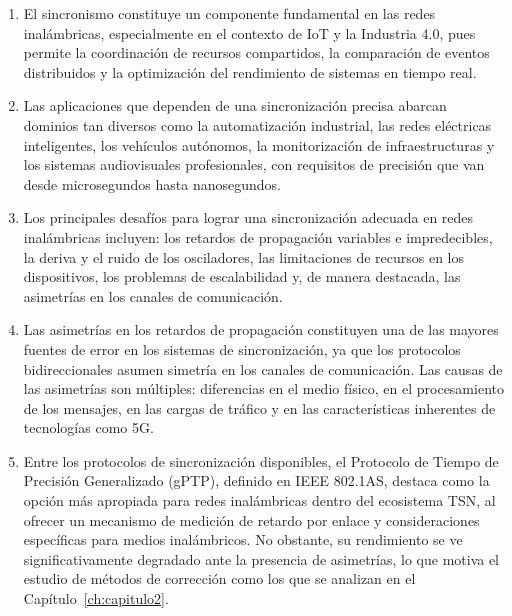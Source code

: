 \begin{enumerate}
\item El sincronismo constituye un componente fundamental en las redes inalámbricas, especialmente en el contexto de IoT y la Industria 4.0, pues permite la coordinación de recursos compartidos, la comparación de eventos distribuidos y la optimización del rendimiento de sistemas en tiempo real.

\item Las aplicaciones que dependen de una sincronización precisa abarcan dominios tan diversos como la automatización industrial, las redes eléctricas inteligentes, los vehículos autónomos, la monitorización de infraestructuras y los sistemas audiovisuales profesionales, con requisitos de precisión que van desde microsegundos hasta nanosegundos.

\item Los principales desafíos para lograr una sincronización adecuada en redes inalámbricas incluyen: los retardos de propagación variables e impredecibles, la deriva y el ruido de los osciladores, las limitaciones de recursos en los dispositivos, los problemas de escalabilidad y, de manera destacada, las asimetrías en los canales de comunicación.

\item Las asimetrías en los retardos de propagación constituyen una de las mayores fuentes de error en los sistemas de sincronización, ya que los protocolos bidireccionales asumen simetría en los canales de comunicación. Las causas de las asimetrías son múltiples: diferencias en el medio físico, en el procesamiento de los mensajes, en las cargas de tráfico y en las características inherentes de tecnologías como 5G.

\item Entre los protocolos de sincronización disponibles, el Protocolo de Tiempo de Precisión Generalizado (gPTP), definido en IEEE 802.1AS, destaca como la opción más apropiada para redes inalámbricas dentro del ecosistema TSN, al ofrecer un mecanismo de medición de retardo por enlace y consideraciones específicas para medios inalámbricos. No obstante, su rendimiento se ve significativamente degradado ante la presencia de asimetrías, lo que motiva el estudio de métodos de corrección como los que se analizan en el Capítulo~\ref{ch:capitulo2}.
\end{enumerate}
